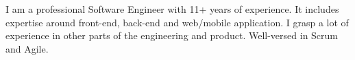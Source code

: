 

I am a professional Software Engineer
with 11+ years of experience. It includes
expertise around front-end, back-end and web/mobile application. I grasp a lot of experience
in other parts of the engineering and product. Well-versed in Scrum and Agile.
\smallskip






\smallskip
{}


 









     


